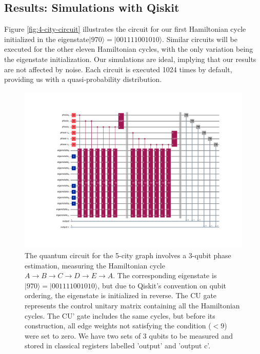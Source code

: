 \documentclass[msc,oneside]{ubcthesis}
\begin{document}
		\subsection{Results: Simulations with Qiskit}  \label{5-city-sim}
	
	Figure \ref{fig:4-city-circuit} illustrates the circuit for our first Hamiltonian cycle initialized in the eigenstate$|970\rangle  = |001111001010\rangle$. Similar circuits will be executed for the other eleven Hamiltonian cycles, with the only variation being the eigenstate initialization. Our simulations are ideal, implying that our results are not affected by noise. Each circuit is executed 1024 times by default, providing us with a quasi-probability distribution.
	
	\begin{figure}[!h]
		\centering
		\includegraphics[trim={8.5cm 4.4cm 6cm 4.4cm},clip, width=1 \linewidth]{"graphics/5-city-1-cycle-constrained-barrier"}
		\caption{ The quantum circuit for the 5-city graph involves a 3-qubit phase estimation, measuring the Hamiltonian cycle $A \rightarrow B \rightarrow C \rightarrow D \rightarrow E \rightarrow A$. The corresponding eigenstate is $|970\rangle  = |001111001010\rangle$, but due to Qiskit's convention on qubit ordering, the eigenstate is initialized in reverse. The CU gate represents the control unitary matrix containing all the Hamiltonian cycles. The CU' gate includes the same cycles, but before its construction, all edge weights not satisfying the condition ($< 9$) were set to zero. We have two sets of 3 qubits to be measured and stored in classical registers labelled 'output' and 'output c'.
		}
		\label{fig:5-city-circuit}
	\end{figure}
	
\end{document}
